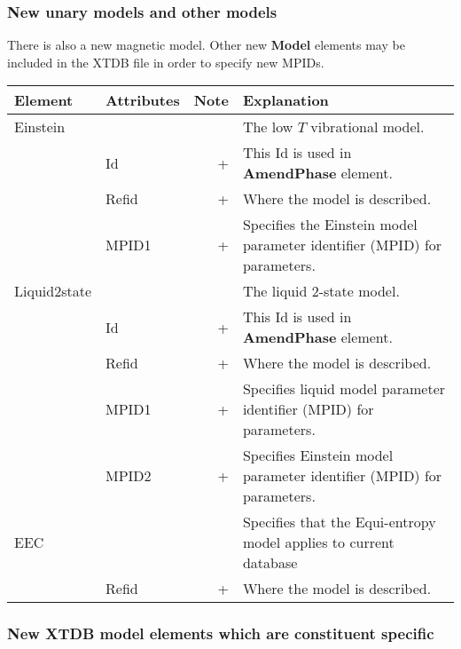 \documentclass{article}
\begin{document}

\newpage 

\subsubsection{New unary models and other models}

There is also a new magnetic model.  Other new {\bf Model} elements
may be included in the XTDB file in order to specify new MPIDs.

\bigskip
\begin{tabular}{|p{} p{} r p{}|}\hline
  Element & Attributes & Note & Explanation\\\hline

  Einstein & && The low $T$ vibrational model.\\
      & Id & + & This Id is used in {\bf AmendPhase} element.\\
      & Refid & + & Where the model is described.\\
      & MPID1 & + & Specifies the Einstein model parameter identifier (MPID) for parameters.\\\hline

  Liquid2state & && The liquid 2-state model.\\
      & Id & + & This Id is used in {\bf AmendPhase} element.\\
      & Refid & + & Where the model is described.\\
      & MPID1 & + & Specifies liquid model parameter identifier (MPID) for parameters.\\
      & MPID2 & + & Specifies Einstein model parameter identifier (MPID) for parameters.\\\hline

  EEC & && Specifies that the Equi-entropy model applies to current database\\
      & Refid & + & Where the model is described.\\\hline

\end{tabular}


\newpage 

\subsubsection{New XTDB model elements which are constituent specific}\label{sec:toop}
\end{document}
